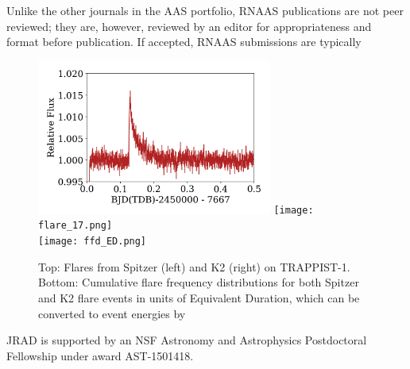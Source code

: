 \documentclass{rnaastex}
\begin{document}
Unlike the other journals in the AAS portfolio, RNAAS publications are not
peer reviewed; they are, however, reviewed by an editor for appropriateness
and format before publication. If accepted, RNAAS submissions are typically



\begin{figure}[h!]
\begin{center}
\includegraphics[height=2in]{trappist1_flare3.png}
\texttt{[image: flare\_17.png]}\\
\texttt{[image: ffd\_ED.png]}
\caption{Top: Flares from Spitzer (left) and K2 (right) on TRAPPIST-1. 
Bottom: Cumulative flare frequency distributions for both Spitzer and K2 flare events in units of Equivalent Duration, which can be converted to event energies by 
\label{fig:1}}
\end{center}
\end{figure}



\acknowledgments

JRAD is supported by an NSF Astronomy and Astrophysics Postdoctoral Fellowship under award AST-1501418. 



\end{document}
